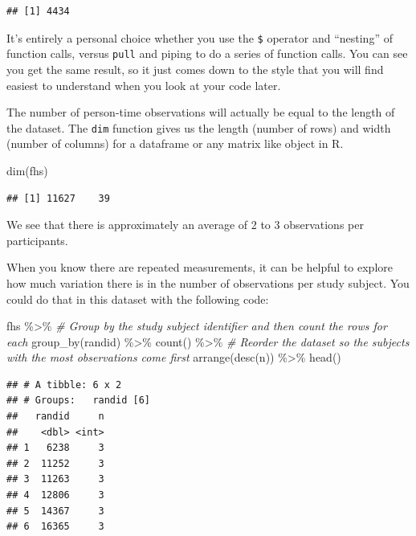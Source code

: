\documentclass[
]{book}
\newenvironment{Shaded}{\begin{snugshade}}{\end{snugshade}}
\newcommand{\CommentTok}[1]{\textcolor[rgb]{0.56,0.35,0.01}{\textit{#1}}}
\newcommand{\FunctionTok}[1]{\textcolor[rgb]{0.00,0.00,0.00}{#1}}
\newcommand{\NormalTok}[1]{#1}
\newcommand{\SpecialCharTok}[1]{\textcolor[rgb]{0.00,0.00,0.00}{#1}}
\begin{document}
\begin{verbatim}
## [1] 4434
\end{verbatim}

It's entirely a personal choice whether you use the \texttt{\$} operator and ``nesting''
of function calls, versus \texttt{pull} and piping to do a series of function calls.
You can see you get the same result, so it just comes down to the style that
you will find easiest to understand when you look at your code later.

The number of person-time observations will actually be equal to the length of the dataset.
The \texttt{dim} function gives us the length (number of rows) and width (number of columns) for a dataframe or any matrix like object in R.

\begin{Shaded}
\begin{Highlighting}[]
\FunctionTok{dim}\NormalTok{(fhs)}
\end{Highlighting}
\end{Shaded}

\begin{verbatim}
## [1] 11627    39
\end{verbatim}

We see that there is approximately an average of 2 to 3 observations per participants.

When you know there are repeated measurements, it can be helpful to explore
how much variation there is in the number of observations per study subject.
You could do that in this dataset with the following code:

\begin{Shaded}
\begin{Highlighting}[]
\NormalTok{fhs }\SpecialCharTok{\%\textgreater{}\%} 
  \CommentTok{\# Group by the study subject identifier and then count the rows for each}
  \FunctionTok{group\_by}\NormalTok{(randid) }\SpecialCharTok{\%\textgreater{}\%} 
  \FunctionTok{count}\NormalTok{() }\SpecialCharTok{\%\textgreater{}\%} 
  \CommentTok{\# Reorder the dataset so the subjects with the most observations come first}
  \FunctionTok{arrange}\NormalTok{(}\FunctionTok{desc}\NormalTok{(n)) }\SpecialCharTok{\%\textgreater{}\%} 
  \FunctionTok{head}\NormalTok{()}
\end{Highlighting}
\end{Shaded}

\begin{verbatim}
## # A tibble: 6 x 2
## # Groups:   randid [6]
##   randid     n
##    <dbl> <int>
## 1   6238     3
## 2  11252     3
## 3  11263     3
## 4  12806     3
## 5  14367     3
## 6  16365     3
\end{verbatim}
\end{document}
